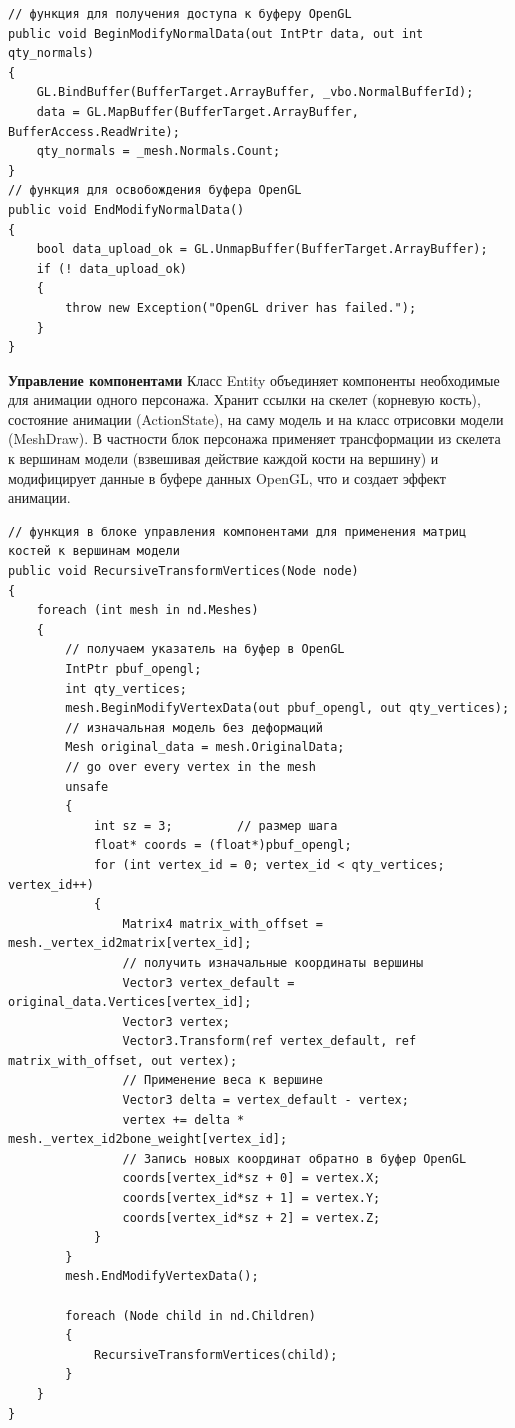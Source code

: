 \begin{verbatim}
// функция для получения доступа к буферу OpenGL
public void BeginModifyNormalData(out IntPtr data, out int qty_normals)
{
    GL.BindBuffer(BufferTarget.ArrayBuffer, _vbo.NormalBufferId);
    data = GL.MapBuffer(BufferTarget.ArrayBuffer, BufferAccess.ReadWrite);
    qty_normals = _mesh.Normals.Count;
}
// функция для освобождения буфера OpenGL
public void EndModifyNormalData()
{
    bool data_upload_ok = GL.UnmapBuffer(BufferTarget.ArrayBuffer);
    if (! data_upload_ok)
    {
        throw new Exception("OpenGL driver has failed.");
    }
}
\end{verbatim}


\textbf{Управление компонентами}
Класс Entity объединяет компоненты необходимые для анимации одного персонажа. Хранит ссылки на скелет (корневую кость), состояние анимации (ActionState), на саму модель и на класс отрисовки модели (MeshDraw).
    \medskip
    В частности блок персонажа применяет трансформации из скелета к вершинам модели (взвешивая действие каждой кости на вершину) и модифицирует данные в буфере данных OpenGL, что и создает эффект анимации.
    
\begin{verbatim}
// функция в блоке управления компонентами для применения матриц костей к вершинам модели
public void RecursiveTransformVertices(Node node)
{
    foreach (int mesh in nd.Meshes)
    {
        // получаем указатель на буфер в OpenGL
        IntPtr pbuf_opengl;
        int qty_vertices;
        mesh.BeginModifyVertexData(out pbuf_opengl, out qty_vertices);
        // изначальная модель без деформаций
        Mesh original_data = mesh.OriginalData;
        // go over every vertex in the mesh
        unsafe
        {
            int sz = 3;         // размер шага
            float* coords = (float*)pbuf_opengl;
            for (int vertex_id = 0; vertex_id < qty_vertices; vertex_id++)
            {
                Matrix4 matrix_with_offset = mesh._vertex_id2matrix[vertex_id];
                // получить изначальные координаты вершины
                Vector3 vertex_default = original_data.Vertices[vertex_id];
                Vector3 vertex;
                Vector3.Transform(ref vertex_default, ref matrix_with_offset, out vertex);
                // Применение веса к вершине
                Vector3 delta = vertex_default - vertex;
                vertex += delta *  mesh._vertex_id2bone_weight[vertex_id];
                // Запись новых координат обратно в буфер OpenGL
                coords[vertex_id*sz + 0] = vertex.X;
                coords[vertex_id*sz + 1] = vertex.Y;
                coords[vertex_id*sz + 2] = vertex.Z;
            }
        }
        mesh.EndModifyVertexData();

        foreach (Node child in nd.Children)
        {
            RecursiveTransformVertices(child);
        }
    }
}
\end{verbatim}


